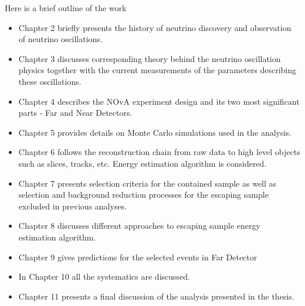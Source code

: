 Here is a brief outline of the work

\begin{itemize}

\item Chapter 2 briefly presents the history of neutrino discovery and observation 
of neutrino oscillations.

\item Chapter 3 discusses corresponding theory behind the neutrino oscillation physics
together with the current measurements of the parameters describing these oscillations.

\item Chapter 4 describes the NOvA experiment design and its two most significant parts -
Far and Near Detectors.

\item Chapter 5 provides details on Monte Carlo simulations used in the analysis.

\item Chapter 6 follows the reconstruction chain from raw data to high level objects 
such as slices, tracks, etc. Energy estimation algorithm is considered.

\item Chapter 7 presents selection criteria for the contained sample as well as selection 
and background reduction processes for the escaping sample excluded in previous analyses.

\item Chapter 8 discusses different approaches to escaping sample energy estimation 
algorithm.

\item Chapter 9 gives predictions for the selected events in Far Detector

\item In Chapter 10 all the systematics are discussed.

\item Chapter 11 presents a final discussion of the analysis presented in the
thesis.

\end{itemize}
